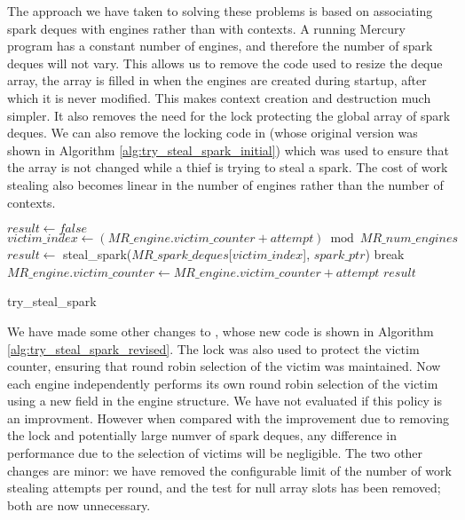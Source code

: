 The approach we have taken to solving these problems is based on associating
spark deques with engines rather than with contexts.
A running Mercury program has a constant number of engines,
and therefore the number of spark deques will not vary.
This allows us to remove the code used to resize the deque array,
the array is filled in when the engines are created during startup,
after which it is never modified.
This makes context creation and destruction much simpler.
It also removes the need for the lock protecting the global array of spark
deques.
We can also remove the locking code in \trystealspark
(whose original version was shown in Algorithm
\ref{alg:try_steal_spark_initial})
which was used to
ensure that the array is not changed while a thief is trying to steal a
spark.
The cost of work stealing also becomes linear in the number of engines
rather than the number of contexts.

\begin{algorithm}[tbp]
\begin{algorithmic}[1]
  \State $result \gets false$
    \State $victim\_index \gets
        (MR\_engine.victim\_counter + attempt) \bmod MR\_num\_engines$
    \State $result \gets$
        steal\_spark($MR\_spark\_deques$[$victim\_index$], $spark\_ptr$)
      \State break
    \EndIf
  \EndFor
  \State $MR\_engine.victim\_counter \gets
    MR\_engine.victim\_counter + attempt$
  \State \Return $result$
\EndProcedure
\end{algorithmic}
\caption{try\_steal\_spark}
\label{alg:try_steal_spark_revised}
\end{algorithm}

We have made some other changes to \trystealspark,
whose new code is shown in Algorithm \ref{alg:try_steal_spark_revised}.
The lock was also used to protect the victim counter,
ensuring that round robin selection of the victim was maintained.
Now each engine independently performs its own round robin selection of the
victim using a new field  in the engine structure.
We have not evaluated if this policy is an improvment.
However when compared with the improvement due to removing the lock and
potentially large numver of spark deques,
any difference in performance due to the selection of victims will be
negligible.
The two other changes are minor:
we have removed the configurable limit of the number of work stealing
attempts per round,
and the test for null array slots has been removed;
both are now unnecessary.

